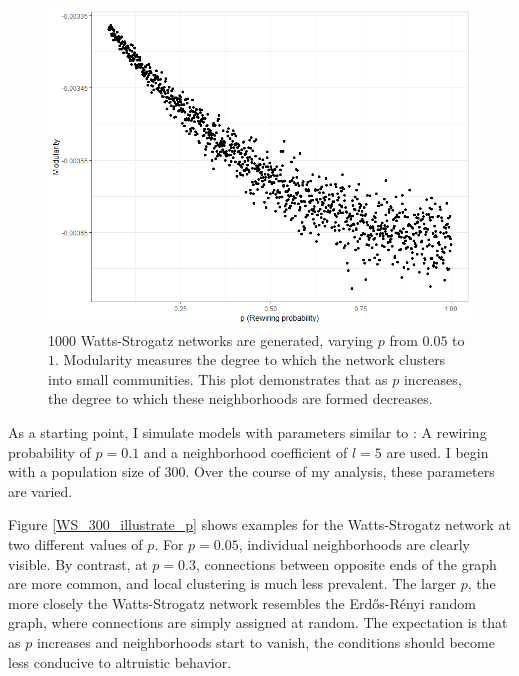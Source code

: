 \documentclass{JASSS}
\begin{document}
\begin{figure}
	\centering
	\includegraphics[width=\linewidth]{./figures/illustrateWS_p_modularity.png}
	\caption{1000 Watts-Strogatz networks are generated, varying $p$ from $0.05$ to $1$. Modularity measures the degree to which the network clusters into small communities. This plot demonstrates that as $p$ increases, the degree to which these neighborhoods are formed decreases.}
	\label{illustrateWS_p_modularity}
\end{figure}

As a starting point, I simulate models with parameters similar to \cite{Peleteiro2014}: A rewiring probability of $p=0.1$ and a neighborhood coefficient of $l=5$ are used. I begin with a population size of 300. Over the course of my analysis, these parameters are varied.

Figure \ref{WS_300_illustrate_p} shows examples for the Watts-Strogatz network at two different values of $p$. For $p = 0.05$, individual neighborhoods are clearly visible. By contrast, at $p = 0.3$, connections between opposite ends of the graph are more common, and local clustering is much less prevalent. The larger $p$, the more closely the Watts-Strogatz network resembles the Erd\H{o}s-R\'{e}nyi random graph, where connections are simply assigned at random. The expectation is that as $p$ increases and neighborhoods start to vanish, the conditions should become less conducive to altruistic behavior.
\end{document}
